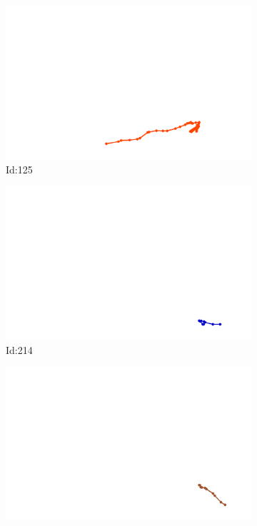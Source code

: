\documentclass[12pt,twoside]{report}
\begin{document}
\begin{figure}
\centering
\begin{subfigure}[b]{0.20\textwidth}
\centering
\includegraphics[width=\textwidth]{../../trajectories/125.png}
\caption{Id:125}
\end{subfigure}
\begin{subfigure}[b]{0.20\textwidth}
\centering
\includegraphics[width=\textwidth]{../../trajectories/214.png}
\caption{Id:214}
\end{subfigure}
\begin{subfigure}[b]{0.20\textwidth}
\centering
\includegraphics[width=\textwidth]{../../trajectories/296.png}

\end{subfigure}
\end{figure}
\end{document}
